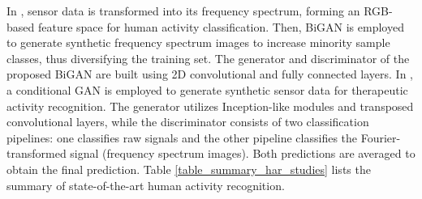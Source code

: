 \documentclass[preprint,12pt]{elsarticle}
\begin{document}
In \citep{kia_human_2024}, sensor data is transformed into its frequency spectrum, forming an RGB-based feature space for human activity classification. Then, BiGAN is employed to generate synthetic frequency spectrum images to increase minority sample classes, thus diversifying the training set. The generator and discriminator of the proposed BiGAN are built using 2D convolutional and fully connected layers. In \citep{mohammadzadeh_cgan-based_2025}, a conditional GAN is employed to generate synthetic sensor data for therapeutic activity recognition. The generator utilizes Inception-like modules and transposed convolutional layers, while the discriminator consists of two classification pipelines: one classifies raw signals and the other pipeline classifies the Fourier-transformed signal (frequency spectrum images). Both predictions are averaged to obtain the final prediction. Table \ref{table_summary_har_studies} lists the summary of state-of-the-art human activity recognition.
\end{document}
